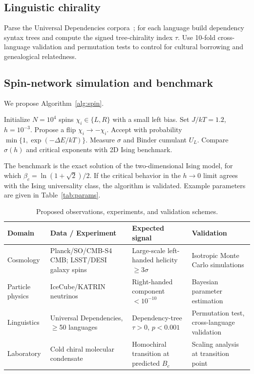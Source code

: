 \documentclass[10pt,a4paper]{article}
\begin{document}
\subsection*{Linguistic chirality}
Parse the Universal Dependencies corpora~\cite{UD}; for each language build dependency syntax trees and compute the signed tree-chirality index $\tau$. Use 10-fold cross-language validation and permutation tests to control for cultural borrowing and genealogical relatedness.

\subsection*{Spin-network simulation and benchmark}
We propose Algorithm~\ref{alg:spin}.

\begin{algorithm}[htbp]
\caption{Chiral spin-network Monte Carlo}\label{alg:spin}
\begin{algorithmic}[1]
\State Initialize $N=10^4$ spins $\chi_i\in\{L,R\}$ with a small left bias.
\State Set $J/kT=1.2$, $h=10^{-3}$.
    \State Propose a flip $\chi_i\to -\chi_i$.
    \State Accept with probability $\min\{1,\exp(-\Delta E/kT)\}$.
  \EndFor
    \State Measure $\sigma$ and Binder cumulant $U_L$.
  \EndIf
\EndFor
\State Compare $\sigma(h)$ and critical exponents with 2D Ising benchmark.
\end{algorithmic}
\end{algorithm}

The benchmark is the exact solution of the two-dimensional Ising model, for which $\beta_c=\ln(1+\sqrt{2})/2$. If the critical behavior in the $h\to 0$ limit agrees with the Ising universality class, the algorithm is validated. Example parameters are given in Table~\ref{tab:params}.


\begin{table}[htbp] \centering \caption{Proposed observations, experiments, and validation schemes.} \begin{tabularx}{\textwidth}{@{}>{\raggedright\arraybackslash}p{2cm}X>{\raggedright\arraybackslash}p{3.2cm}>{\raggedright\arraybackslash}p{3.2cm}@{}}  \toprule \textbf{Domain} & \textbf{Data / Experiment} & \textbf{Expected signal} & \textbf{Validation} \\ \midrule Cosmology & Planck/SO/CMB-S4 CMB; LSST/DESI galaxy spins & Large-scale left-handed helicity $\ge3\sigma$ & Isotropic Monte Carlo simulations \\ Particle physics & IceCube/KATRIN neutrinos & Right-handed component $<10^{-10}$ & Bayesian parameter estimation \\ Linguistics & Universal Dependencies, $\ge$50 languages & Dependency-tree $\tau>0$, $p<0.001$ & Permutation test, cross-language validation \\ Laboratory & Cold chiral molecular condensate & Homochiral transition at predicted $B_c$ & Scaling analysis at transition point \\ \bottomrule \end{tabularx} \label{tab:obs} \end{table}
\end{document}
